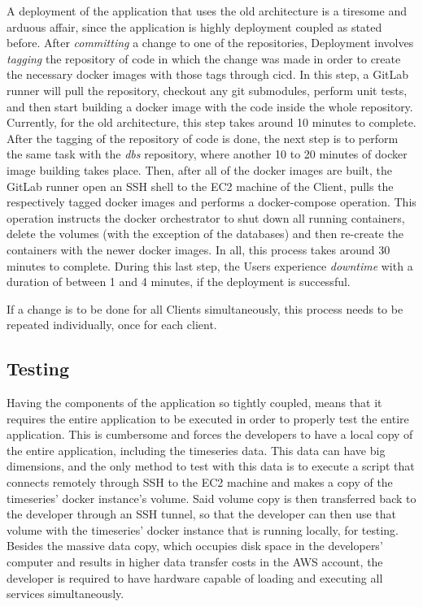 A deployment of the application that uses the old architecture is a tiresome and arduous affair, since the application is highly deployment coupled as stated before. After \textit{committing} a change to one of the repositories, Deployment involves \textit{tagging} the repository of code in which the change was made in order to create the necessary docker images with those tags through \gls{cicd}. In this step, a GitLab runner will pull the repository, checkout any git submodules, perform unit tests, and then start building a docker image with the code inside the whole repository. Currently, for the old architecture, this step takes around 10 minutes to complete. After the tagging of the repository of code is done, the next step is to perform the same task with the \textit{dbs} repository, where another 10 to 20 minutes of docker image building takes place. Then, after all of the docker images are built, the GitLab runner open an SSH shell to the EC2 machine of the Client, pulls the respectively tagged docker images and performs a docker-compose operation. This operation instructs the docker orchestrator to shut down all running containers, delete the volumes (with the exception of the databases) and then re-create the containers with the newer docker images. In all, this process takes around 30 minutes to complete. During this last step, the Users experience \textit{downtime} with a duration of between 1 and 4 minutes, if the deployment is successful.

If a change is to be done for all Clients simultaneously, this process needs to be repeated individually, once for each client. 

\subsection{Testing}\label{methodology:sss:testing}

Having the components of the application so tightly coupled, means that it requires the entire application to be executed in order to properly test the entire application. This is cumbersome and forces the developers to have a local copy of the entire application, including the timeseries data. This data can have big dimensions, and the only method to test with this data is to execute a script that connects remotely through SSH to the EC2 machine and makes a copy of the timeseries' docker instance's volume. Said volume copy is then transferred back to the developer through an SSH tunnel, so that the developer can then use that volume with the timeseries' docker instance that is running locally, for testing. Besides the massive data copy, which occupies disk space in the developers' computer and results in higher data transfer costs in the AWS account, the developer is required to have hardware capable of loading and executing all services simultaneously.

